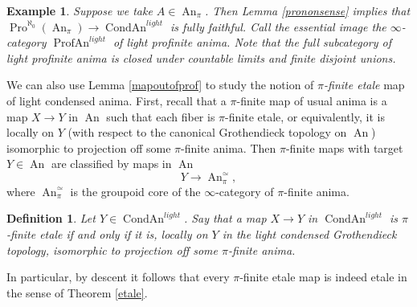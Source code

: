 \documentclass[12pt]{article}
\newtheorem{definition}[theorem]{Definition}
\newtheorem{example}[theorem]{Example}
\newcommand{\on}{\operatorname}
\begin{document}
\begin{example}
Suppose we take $A\in\on{An}_\pi$.  Then Lemma \ref{prononsense} implies that $\on{Pro}^{\aleph_0}(\on{An}_\pi)\rightarrow \on{CondAn}^{light}$ is fully faithful.  Call the essential image the $\infty$-category $\on{ProfAn}^{light}$ of \emph{light profinite anima}.  Note that the full subcategory of light profinite anima is closed under countable limits and finite disjoint unions.
\end{example}

We can also use Lemma \ref{mapoutofprof} to study the notion of \emph{$\pi$-finite etale} map of light condensed anima.  First, recall that a $\pi$-finite map of usual anima is a map $X\to Y$ in $\on{An}$ such that each fiber is $\pi$-finite etale, or equivalently, it is locally on $Y$ (with respect to the canonical Grothendieck topology on $\on{An}$) isomorphic to projection off some $\pi$-finite anima.  Then $\pi$-finite maps with target $Y\in \on{An}$ are classified by maps in $\on{An}$
$$Y\to \on{An}^{\simeq}_{\pi},$$
where $\on{An}^{\simeq}_{\pi}$ is the groupoid core of the $\infty$-category of $\pi$-finite anima.

\begin{definition}\label{pifiniteetale}
Let $Y\in\on{CondAn}^{light}$.  Say that a map $X\to Y$ in $\on{CondAn}^{light}$ is \emph{$\pi$-finite etale} if and only if it is, locally on $Y$ in the light condensed Grothendieck topology, isomorphic to projection off some $\pi$-finite anima.
\end{definition}

In particular, by descent it follows that every $\pi$-finite etale map is indeed etale in the sense of Theorem \ref{etale}.
\end{document}
